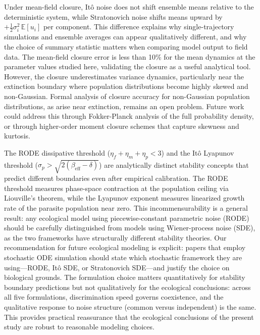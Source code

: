 \documentclass[12pt]{article}
\begin{document}
Under mean-field closure, It\^{o} noise does not shift ensemble means relative to the deterministic system, while Stratonovich noise shifts means upward by $+\tfrac{1}{2}\sigma_i^2\,\mathbb{E}[u_i]$ per component.  This difference explains why single-trajectory simulations and ensemble averages can appear qualitatively different, and why the choice of summary statistic matters when comparing model output to field data.  The mean-field closure error is less than 10\% for the mean dynamics at the parameter values studied here, validating the closure as a useful analytical tool.  However, the closure underestimates variance dynamics, particularly near the extinction boundary where population distributions become highly skewed and non-Gaussian.  Formal analysis of closure accuracy for non-Gaussian population distributions, as arise near extinction, remains an open problem.  Future work could address this through Fokker-Planck analysis of the full probability density, or through higher-order moment closure schemes that capture skewness and kurtosis.

The RODE dissipative threshold ($\eta_f + \eta_m + \eta_p < 3$) and the It\^{o} Lyapunov threshold ($\sigma_p > \sqrt{2(\beta_{\text{eff}} - \delta)}$) are analytically distinct stability concepts that predict different boundaries even after empirical calibration.  The RODE threshold measures phase-space contraction at the population ceiling via Liouville's theorem, while the Lyapunov exponent measures linearized growth rate of the parasite population near zero.  This incommensurability is a general result: any ecological model using piecewise-constant parametric noise (RODE) should be carefully distinguished from models using Wiener-process noise (SDE), as the two frameworks have structurally different stability theories.  Our recommendation for future ecological modeling is explicit: papers that employ stochastic ODE simulation should state which stochastic framework they are using---RODE, It\^{o} SDE, or Stratonovich SDE---and justify the choice on biological grounds.  The formulation choice matters quantitatively for stability boundary predictions but not qualitatively for the ecological conclusions: across all five formulations, discrimination speed governs coexistence, and the qualitative response to noise structure (common versus independent) is the same.  This provides practical reassurance that the ecological conclusions of the present study are robust to reasonable modeling choices.


\appendix
\end{document}
